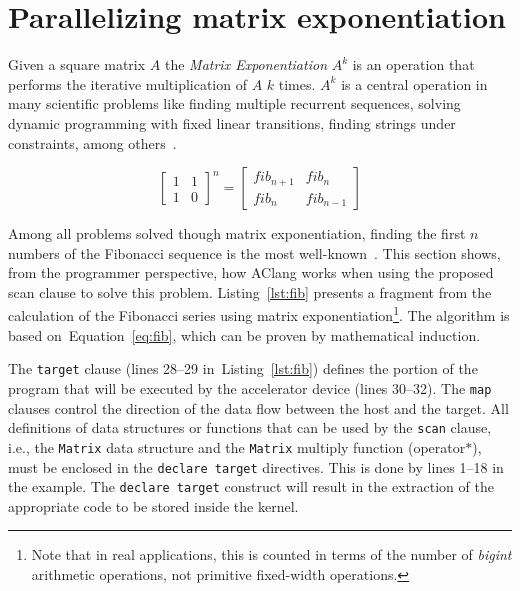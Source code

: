 \documentclass[Ingles]{ic-tese-v1}
\newcommand{\req}[1]{Equation~\ref{eq:#1}}
\newcommand{\ttt}[1]{{\texttt{#1}}}
\newcommand{\rlst}[1]{Listing~\ref{lst:#1}}
\begin{document}
\section{Parallelizing matrix exponentiation}
\label{sec:fibonacci}

Given a square matrix $A$ the \textit{Matrix Exponentiation} $A^k$ is an operation
that performs the iterative multiplication of $A$ $k$ times. $A^k$ is a central
operation in many scientific problems like finding multiple recurrent sequences,
solving dynamic programming with fixed linear transitions, finding strings under
constraints, among others~\cite{doi:10}.

\begin{equation}
\begin{bmatrix}1 & 1 \\ 1 & 0\end{bmatrix}^{n}
= \begin{bmatrix}fib_{n+1} & fib_{n}\\fib_{n} &
fib_{n-1}\end{bmatrix}
\label{eq:fib}
\end{equation}

Among all problems solved though matrix exponentiation, finding the first $n$
numbers of the Fibonacci sequence is the most well-known~\cite{fibonacci}.
This section shows, from the programmer perspective,    how AClang works   when
using the proposed scan clause to solve this problem. \rlst{fib}  presents a
fragment from  the calculation  of the  Fibonacci series  using matrix
exponentiation\footnote{Note  that  in   real  applications,  this  is
	counted in terms of the  number of \textit{bigint} arithmetic operations, not
	primitive  fixed-width  operations.}. The algorithm  is  based  on~\req{fib},
which can be proven by mathematical induction.

The \ttt{target} clause (lines 28--29 in~\rlst{fib}) defines the portion of the
program  that will  be  executed by  the  accelerator device  (lines
30--32).  The \ttt{map}  clauses control the direction  of the data flow
between the host and the  target. All definitions of data structures
or functions  that can be used  by the \ttt{scan} clause,  i.e., the
\ttt{Matrix} data  structure and the \ttt{Matrix}  multiply function
(operator$*$),  must   be  enclosed  in  the   \ttt{declare  target}
directives. This is done by lines 1--18 in the example.  The \ttt{declare  target}
construct  will result in  the extraction of  the appropriate
code to be stored inside the kernel.
\end{document}
